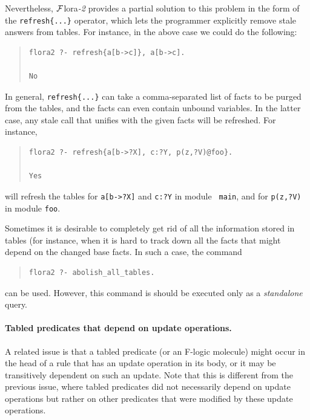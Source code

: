 \documentclass[11pt]{article}
\newcommand{\FLORA}{{\mbox{\sc ${\cal F}${lora}\rm\emph{-2}}}\xspace}
\begin{document}
Nevertheless, \FLORA provides a partial solution to this problem in the form
of the {\tt refresh\{...\}} operator, which lets the programmer explicitly
remove stale answers from tables. For instance, in the above case we could
do the following:
\begin{quote}
\begin{verbatim}
flora2 ?- refresh{a[b->c]}, a[b->c].

No
\end{verbatim}
\end{quote}
In general, {\tt refresh\{...\}} can take a comma-separated list of facts to
be purged from the tables, and the facts can even contain unbound variables.
In the latter case, any stale call that unifies with the given facts will
be refreshed. For instance,
\begin{quote}
\begin{verbatim}
flora2 ?- refresh{a[b->?X], c:?Y, p(z,?V)@foo}.

Yes
\end{verbatim}
\end{quote}
will refresh the tables for {\tt a[b->?X]} and {\tt c:?Y} in module {\tt
  main}, and for {\tt p(z,?V)} in module {\tt foo}.

Sometimes it is desirable to completely get rid of all the information
stored in tables (for instance, when it is hard to track down all the facts
that might depend on the changed base facts. In such a case, the command
\begin{quote}
\begin{verbatim}
flora2 ?- abolish_all_tables.
\end{verbatim}
\end{quote}
can be used. However, this command is should be executed only as
a \emph{standalone} query.



\paragraph{Tabled predicates that depend on update operations.}
\label{page-depchk}
A related issue is that a tabled predicate (or an F-logic molecule)
might occur in the head of a rule that has an update operation in its body,
or it may be transitively dependent on such an update. Note that this is
different from the previous issue, where tabled predicates did not
necessarily depend on update operations but rather on other predicates that
were modified by these update operations.
\end{document}
